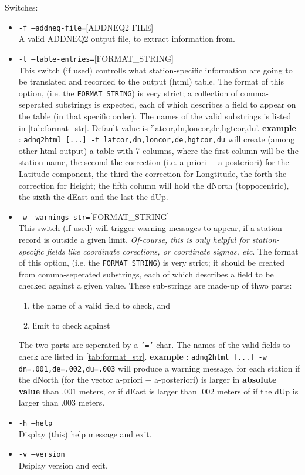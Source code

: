 Switches:
\begin{itemize}
\item \texttt{-f --addneq-file=}[ADDNEQ2 FILE]\\
A valid ADDNEQ2 output file, to extract information from.
\item \texttt{-t --table-entries=}[FORMAT\_STRING]\\
This switch (if used) controlls what station-specific information are going to be
translated and recorded to the output (html) table. The format of this option,
(i.e. the \texttt{FORMAT\_STRING}) is very strict; a collection of comma-seperated
substrings is expected, each of which describes a field to appear on the table 
(in that specific order). The names of the valid substrings is listed in 
\autoref{tab:format_str}. 
\underline{Default value is 'latcor,dn,loncor,de,hgtcor,du'}.
\textbf{example} : \texttt{adnq2html [...] -t latcor,dn,loncor,de,hgtcor,du} will
create (among other html output) a table with 7 columns, where the first column
will be the station name, the second the correction (i.e. a-priori $-$ a-posteriori)
for the Latitude component, the third the correction for Longtitude, the forth
the correction for Height; the fifth column will hold the dNorth (toppocentric),
the sixth the dEast and the last the dUp.
\item \texttt{-w --warnings-str=}[FORMAT\_STRING]\\
This switch (if used) will trigger warning messages to appear, if a station record
is outside a given limit. \textit{Of-course, this is only helpful for station-specific 
fields like coordinate corections, or coordinate sigmas, etc}. The format of this option,
(i.e. the \texttt{FORMAT\_STRING}) is very strict; it should be created from 
comma-seperated substrings, each of which describes a field to be checked against 
a given value. These sub-strings are made-up of thwo parts:
\begin{enumerate}
\item the name of a valid field to check, and
\item limit to check against
\end{enumerate}
The two parts are seperated by a \texttt{'='} char. The names of the valid fields 
to check are listed in \autoref{tab:format_str}.
\textbf{example} : \texttt{adnq2html [...] -w dn=.001,de=.002,du=.003} will produce a
warning message, for each station if the dNorth (for the vector a-priori $-$ a-posteriori)
is larger in \textbf{absolute value} than .001 meters, or if dEast is larger than
.002 meters of if the dUp is larger than .003 meters.
\item \texttt{-h --help}\\
Display (this) help message and exit.
\item \texttt{-v --version}\\
Dsiplay version and exit.
\end{itemize}

